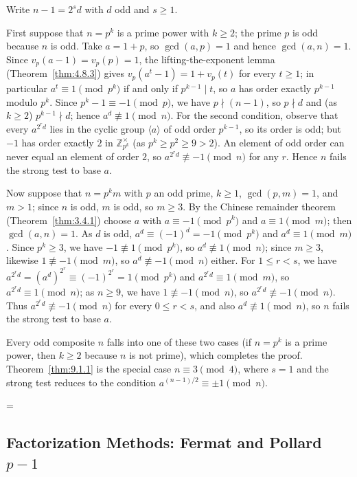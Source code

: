 \documentclass[11pt]{article}
\makeatletter
\theoremstyle{ntstyle}
\let\nt@closedisplay\]
\def\nt@guardedclose{\@ifnextchar\par{\nt@closeafterpar}{\@ifnextchar\end{\postdisplaypenalty\@M\nt@closedisplay}{\nt@closedisplay}}}
\def\nt@closeafterpar\par{\@ifnextchar\par{\nt@closeafterpar}{\@ifnextchar\end{\postdisplaypenalty\@M\nt@closedisplay\par}{\nt@closedisplay\par}}}
\renewenvironment{proof}[1][\proofname]{\par
  \pushQED{\qed}\normalfont\topsep\medskipamount\edef\nt@afterproof{\@endparpenalty=\the\@endparpenalty\relax}\@beginparpenalty\@M\@endparpenalty\@M\let\]\nt@guardedclose\trivlist\item[]\textit{#1\@addpunct{.}} \ignorespaces}{\ifvmode\addpenalty\@M\fi\popQED\nt@afterproof\endtrivlist\@endpefalse}
\newcommand{\ZmodUnits}[1]{\mathbb{Z}_{#1}^{\times}}
\makeatother
\begin{document}
\begin{proof} Write $n-1=2^{s}d$ with $d$ odd and $s\ge1$.

	First suppose that $n=p^{k}$ is a prime power with $k\ge2$; the prime
	$p$ is odd because $n$ is odd. Take $a=1+p$, so $\gcd(a, p)=1$ and
	hence $\gcd(a, n)=1$. Since
	$v_p(a-1)=v_p(p)=1$, the lifting-the-exponent lemma (Theorem~\ref{thm:4.8.3}) gives
	$v_p(a^{t}-1)=1+v_p(t)$ for every $t\ge1$; in particular
	$a^t\equiv1\pmod{p^k}$ if and only if $p^{k-1}\mid t$, so $a$ has order exactly
	$p^{k-1}$ modulo $p^k$. Since $p^k-1\equiv-1\pmod{p}$, we have $p\nmid(n-1)$,
	so $p\nmid d$ and (as $k\ge2$) $p^{k-1}\nmid d$; hence
	$a^{d}\not\equiv1\pmod{n}$. For the second condition, observe that every
	$a^{2^rd}$ lies in the cyclic group $\langle a\rangle$ of odd order
	$p^{k-1}$, so its order is odd; but $-1$ has order exactly $2$ in
	$\ZmodUnits{p^k}$ (as $p^k\ge p^2\ge9>2$). An
	element of odd order can never equal an element of order $2$, so
	$a^{2^{r}d}\not\equiv-1\pmod{n}$ for any $r$. Hence $n$ fails the
	strong test to base $a$.

	Now suppose that $n=p^{k}m$ with $p$ an odd prime, $k\ge1$,
	$\gcd(p, m)=1$, and $m>1$; since $n$ is odd, $m$ is odd, so $m\ge3$.
	By the
	Chinese remainder theorem (Theorem~\ref{thm:3.4.1}) choose $a$ with
	$a\equiv-1\pmod{p^k}$ and $a\equiv1\pmod{m}$; then $\gcd(a, n)=1$. As
	$d$ is odd, $a^{d}\equiv(-1)^d=-1\pmod{p^{k}}$ and $a^{d}\equiv1\pmod{m}$. Since $p^{k}\ge3$, we have $-1\not\equiv1\pmod{p^k}$, so
	$a^{d}\not\equiv1\pmod{n}$; since $m\ge3$, likewise $1\not\equiv-1\pmod{m}$, so
	$a^{d}\not\equiv-1\pmod{n}$ either. For $1\le r<s$, we have
	$a^{2^{r}d}=(a^{d})^{2^{r}}\equiv(-1)^{2^r}=1\pmod{p^{k}}$ and
	$a^{2^{r}d}\equiv1\pmod{m}$, so $a^{2^{r}d}\equiv1\pmod{n}$; as $n\ge9$,
	we have $1\not\equiv-1\pmod{n}$, so $a^{2^{r}d}\not\equiv-1\pmod{n}$. Thus
	$a^{2^{r}d}\not\equiv-1\pmod{n}$ for every $0\le r<s$, and also
	$a^{d}\not\equiv1\pmod{n}$, so $n$ fails the strong test to base $a$.

	Every odd composite $n$ falls into one of these two cases (if $n=p^{k}$ is a prime power, then $k\ge2$ because $n$ is not prime), which completes the
	proof. Theorem~\ref{thm:9.1.1} is the special case $n\equiv3\pmod{4}$, where
	$s=1$ and the strong test reduces to the condition
	$a^{(n-1)/2}\equiv\pm1\pmod{n}$.

\end{proof}
\subsection{Factorization Methods: Fermat and Pollard \texorpdfstring{$p-1$}{p-1}}
\end{document}
